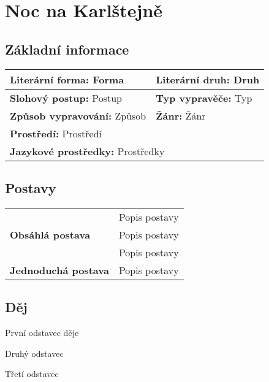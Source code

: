 \section{Noc na Karlštejně}
    \subsection*{Základní informace}
        \begin{center}
            \begin{tabular}{l|l}
                \textbf{Literární forma:} Forma & \textbf{Literární druh:} Druh \\
                \hline
                \textbf{Slohový postup:} Postup & \textbf{Typ vypravěče:} Typ \\
                \hline
                \textbf{Způsob vypravování:} Způsob & \textbf{Žánr:} Žánr \\
                \hline
                \multicolumn{2}{l}{\textbf{Prostředí:} Prostředí} \\
                \hline
                \multicolumn{2}{l}{\textbf{Jazykové prostředky:} Prostředky} \\
            \end{tabular}
        \end{center}
    \subsection*{Postavy}
        \begin{center}
            \begin{tabular}{l|l}
                \multirow{3}{15em}{\textbf{Obsáhlá postava}} & Popis postavy \\
                & Popis postavy \\
                & Popis postavy \\
                \hline
                \textbf{Jednoduchá postava} & Popis postavy \\
            \end{tabular}
        \end{center}
    \subsection*{Děj}
        První odstavec děje

        Druhý odstavec
        
        Třetí odstavec
